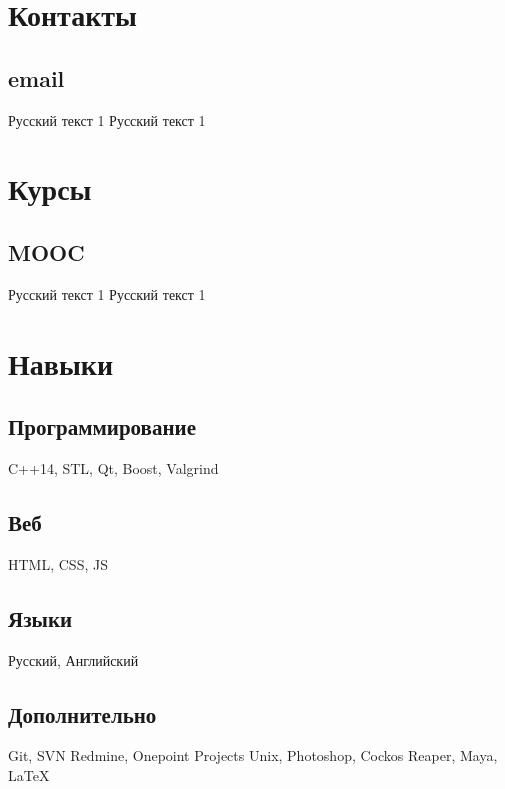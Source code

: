 \documentclass[a4paper]{curricula-vitae}
\begin{document}



\begin{minipage}[t]{0.33\textwidth} %

\section{Контакты} 

\subsection{email}
Русский текст 1
Русский текст 1

\section{Курсы}

\subsection{MOOC}
Русский текст 1
Русский текст 1

\section{Навыки}

\subsection{Программирование}
C++14, STL, Qt, Boost, Valgrind

\subsection{Веб}
HTML, CSS, JS

\subsection{Языки}

Русский, Английский

\subsection{Дополнительно}
Git, SVN
Redmine, 
Onepoint Projects
Unix, Photoshop, 
Cockos Reaper, 
Maya, \LaTeX

\end{minipage} %
\end{document}
